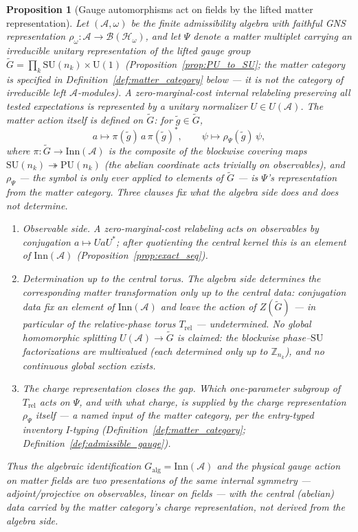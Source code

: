 \documentclass[11pt]{article}
\newtheorem{proposition}[theorem]{Proposition}
\theoremstyle{definition}
\newcommand{\SU}{\mathrm{SU}}
\newcommand{\U}{\mathrm{U}}
\begin{document}
\begin{proposition}[Gauge automorphisms act on fields by the lifted matter representation]
\label{prop:gauge_acts_on_fields}
Let $(\mathcal{A},\omega)$ be the finite admissibility algebra with faithful
GNS representation $\rho_\omega:\mathcal{A}\to\mathcal{B}(\mathcal{H}_\omega)$,
and let $\Psi$ denote a matter multiplet carrying an irreducible unitary
representation of the lifted gauge group
$\widetilde{G} = \prod_k \SU(n_k) \times \U(1)$
(Proposition~\ref{prop:PU_to_SU}; the matter category is specified in
Definition~\ref{def:matter_category} below --- it is \emph{not} the
category of irreducible left $\mathcal{A}$-modules).  A
zero-marginal-cost internal relabeling preserving all tested
expectations is represented by a unitary normalizer
$U\in U(\mathcal{A})$.  The matter action itself is \emph{defined on
$\widetilde{G}$}: for $\tilde g \in \widetilde{G}$,
\[
  a\mapsto \pi(\tilde g)\,a\,\pi(\tilde g)^{*},\qquad
  \psi\mapsto \rho_{\Psi}(\tilde g)\,\psi ,
\]
where $\pi:\widetilde{G}\to \mathrm{Inn}(\mathcal{A})$ is the composite
of the blockwise covering maps $\SU(n_k)\twoheadrightarrow\mathrm{PU}(n_k)$
(the abelian coordinate acts trivially on observables), and
$\rho_\Psi$ --- the symbol is only ever applied to elements of
$\widetilde{G}$ --- is $\Psi$'s representation from the matter category.
Three clauses fix what the algebra side does and does not determine.
\begin{enumerate}[label=(\roman*),nosep]
  \item \emph{Observable side.}  A zero-marginal-cost relabeling acts
  on observables by conjugation $a \mapsto UaU^*$; after quotienting
  the central kernel this is an element of $\mathrm{Inn}(\mathcal{A})$
  (Proposition~\ref{prop:exact_seq}).
  \item \emph{Determination up to the central torus.}  The algebra
  side determines the corresponding matter transformation only up to
  the central data: conjugation data fix an element of
  $\mathrm{Inn}(\mathcal{A})$ and leave the action of
  $Z(\widetilde{G})$ --- in particular of the relative-phase torus
  $T_{\mathrm{rel}}$ --- undetermined.  No global homomorphic splitting
  $U(\mathcal{A}) \to \widetilde{G}$ is claimed: the blockwise
  phase--$\SU$ factorizations are multivalued (each determined only up
  to $\mathbb{Z}_{n_k}$), and no continuous global section exists.
  \item \emph{The charge representation closes the gap.}  Which
  one-parameter subgroup of $T_{\mathrm{rel}}$ acts on $\Psi$, and with
  what charge, is supplied by the charge representation $\rho_\Psi$
  itself --- a named input of the matter category, per the entry-typed
  inventory I-typing (Definition~\ref{def:matter_category};
  Definition~\ref{def:admissible_gauge}).
\end{enumerate}
Thus the algebraic
identification $G_{\mathrm{alg}}=\mathrm{Inn}(\mathcal{A})$ and the
physical gauge action on matter fields are two presentations of the same
internal symmetry --- adjoint/projective on observables, linear on
fields --- with the central (abelian) data carried by the matter
category's charge representation, not derived from the algebra side.
\end{proposition}
\end{document}

